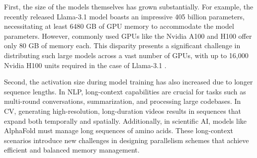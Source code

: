 \documentclass[sigplan,review,anonymous]{acmart}
\begin{document}
First, the size of the models themselves has grown substantially. For example, the recently released Llama-3.1 model \cite{dubey2024llama3herdmodels} boasts an impressive 405 billion parameters, necessitating at least 6480 GB of GPU memory to accommodate the model parameters. However, commonly used GPUs like the Nvidia A100 and H100 offer only 80 GB of memory each. This disparity presents a significant challenge in distributing such large models across a vast number of GPUs, with up to 16,000 Nvidia H100 units required in the case of Llama-3.1 \cite{dubey2024llama3herdmodels}.

Second, the activation size during model training has also increased due to longer sequence lengths. In NLP, long-context capabilities are crucial for tasks such as multi-round conversations\cite{openai2023gpt4}, summarization\cite{Koh2022AnES, beltagy2020longformer}, and processing large codebases\cite{li2023starcodersourceyou, rozière2024codellamaopenfoundation, chowdhery2022palmscalinglanguagemodeling}. In CV, generating high-resolution, long-duration videos\cite{Brooks_2024, peebles2023scalable} results in sequences that expand both temporally and spatially. Additionally, in scientific AI, models like AlphaFold \cite{Jumper2021Alphafold, cheng2023fastfold} must manage long sequences of amino acids. These long-context scenarios introduce new challenges in designing parallelism schemes that achieve efficient and balanced memory management.
\end{document}

